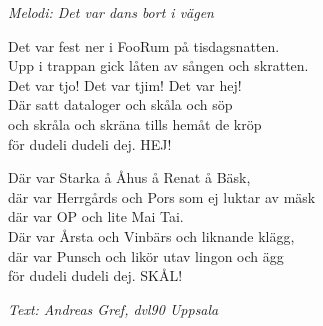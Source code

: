 {\footnotesize\textit{Melodi: Det var dans bort i vägen}}\par
\vspace{10pt}
Det var fest ner i FooRum på tisdagsnatten.\\
Upp i trappan gick låten av sången och skratten.\\
Det var tjo! Det var tjim! Det var hej!\\
Där satt dataloger och skåla och söp\\
och skråla och skräna tills hemåt de kröp\\
för dudeli dudeli dej. HEJ!\par
\vspace{10pt}
Där var Starka å Åhus å Renat å Bäsk,\\
där var Herrgårds och Pors som ej luktar av mäsk\\
där var OP och lite Mai Tai.\\
Där var Årsta och Vinbärs och liknande klägg,\\
där var Punsch och likör utav lingon och ägg\\
för dudeli dudeli dej. SKÅL!\par
\vspace{10pt}
{\footnotesize\textit{Text: Andreas Gref, dvl90 Uppsala}}
